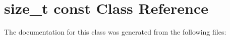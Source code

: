\hypertarget{classsize__t_01const}{}\section{size\+\_\+t const Class Reference}
\label{classsize__t_01const}


The documentation for this class was generated from the following files\+:
